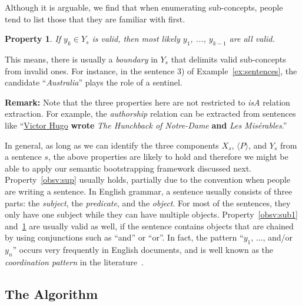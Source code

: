 \documentclass[10pt,journal,cspaper,compsoc]{IEEEtran}
\newcommand{\blankline}{\vspace*{2ex}}
\newcommand{\remark}[1]{\blankline\noindent\textbf{Remark: }#1}
\newtheorem{property}{Property}
\begin{document}
Although it is arguable, we find that when enumerating sub-concepts, people tend to list those that they are familiar with first.

\begin{property}\label{obsv:sub2}
If $y_k\in Y_s$ is valid, then most likely $y_1$, ..., $y_{k-1}$ are all valid.
\end{property}
This means, there is usually a \emph{boundary} in $Y_s$ that delimits valid sub-concepts from invalid ones. For instance, in the sentence 3) of Example~\ref{ex:sentences}, the candidate ``\emph{Australia}'' plays the role of a sentinel.

\remark{
Note that the three properties here are not restricted to \emph{isA} relation extraction. For example, the \emph{authorship} relation can be extracted from sentences like ``\underline{Victor Hugo} \textbf{wrote} \emph{The Hunchback of Notre-Dame} \textbf{and} \emph{Les Mis\'erables}.''
}

In general, as long as we can identify the three components $X_s$, $\langle P\rangle$, and $Y_s$ from a sentence $s$, the above properties are likely to hold and therefore we might be able to apply our semantic bootstrapping framework discussed next. Property~\ref{obsv:sup} usually holds, partially due to the convention when people are writing a sentence. In English grammar, a sentence usually consists of three parts: the \emph{subject}, the \emph{predicate}, and the \emph{object}. For most of the sentences, they only have one subject while they can have multiple objects. Property~\ref{obsv:sub1} and~\ref{obsv:sub2} are usually valid as well, if the sentence contains objects that are chained by using conjunctions such as ``and'' or ``or''. In fact, the pattern ``$y_1$, ..., and/or $y_n$'' occurs very frequently in English documents, and is well known as the \emph{coordination pattern} in the literature~\cite{SnowJN05}.

\subsection{The Algorithm}
\end{document}
